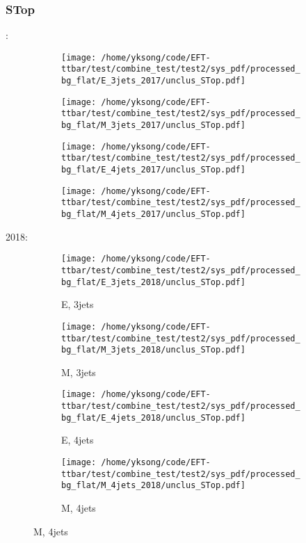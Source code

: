 \documentclass{beamer}
\begin{document}
\begin{frame}
\frametitle{STop}
\fontsize{5}{1}:
\begin{figure}
\centering
\begin{subfigure}[b]{0.24\textwidth}
\texttt{[image: /home/yksong/code/EFT-ttbar/test/combine\_test/test2/sys\_pdf/processed\_bg\_flat/E\_3jets\_2017/unclus\_STop.pdf]}
\end{subfigure}
\begin{subfigure}[b]{0.24\textwidth}
\texttt{[image: /home/yksong/code/EFT-ttbar/test/combine\_test/test2/sys\_pdf/processed\_bg\_flat/M\_3jets\_2017/unclus\_STop.pdf]}
\end{subfigure}
\begin{subfigure}[b]{0.24\textwidth}
\texttt{[image: /home/yksong/code/EFT-ttbar/test/combine\_test/test2/sys\_pdf/processed\_bg\_flat/E\_4jets\_2017/unclus\_STop.pdf]}
\end{subfigure}
\begin{subfigure}[b]{0.24\textwidth}
\texttt{[image: /home/yksong/code/EFT-ttbar/test/combine\_test/test2/sys\_pdf/processed\_bg\_flat/M\_4jets\_2017/unclus\_STop.pdf]}
\end{subfigure}
\end{figure}
2018:
\begin{figure}
\centering
\begin{subfigure}[b]{0.24\textwidth}
\texttt{[image: /home/yksong/code/EFT-ttbar/test/combine\_test/test2/sys\_pdf/processed\_bg\_flat/E\_3jets\_2018/unclus\_STop.pdf]}
\captionsetup{font=tiny}
\caption{E, 3jets}
\end{subfigure}
\begin{subfigure}[b]{0.24\textwidth}
\texttt{[image: /home/yksong/code/EFT-ttbar/test/combine\_test/test2/sys\_pdf/processed\_bg\_flat/M\_3jets\_2018/unclus\_STop.pdf]}
\captionsetup{font=tiny}
\caption{M, 3jets}
\end{subfigure}
\begin{subfigure}[b]{0.24\textwidth}
\texttt{[image: /home/yksong/code/EFT-ttbar/test/combine\_test/test2/sys\_pdf/processed\_bg\_flat/E\_4jets\_2018/unclus\_STop.pdf]}
\captionsetup{font=tiny}
\caption{E, 4jets}
\end{subfigure}
\begin{subfigure}[b]{0.24\textwidth}
\texttt{[image: /home/yksong/code/EFT-ttbar/test/combine\_test/test2/sys\_pdf/processed\_bg\_flat/M\_4jets\_2018/unclus\_STop.pdf]}
\captionsetup{font=tiny}
\caption{M, 4jets}
\end{subfigure}
\end{figure}
\end{frame}
\end{document}
